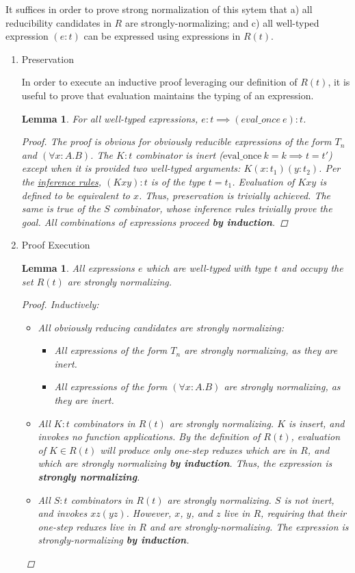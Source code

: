 \documentclass[11pt]{article}
\newtheorem{lemma}[theorem]{Lemma}
\begin{document}
It suffices in order to prove strong normalization of this sytem that a) all reducibility candidates in \(R\) are strongly-normalizing; and c) all well-typed expression \((e : t)\) can be expressed using expressions in \(R(t)\).
\begin{enumerate}
\item Preservation
\label{sec:orgbb7a623}

In order to execute an inductive proof leveraging our definition of \(R(t)\), it is useful to prove that evaluation maintains the typing of an expression.

\begin{lemma}
For all well-typed expressions, $e : t \implies (eval\_once\ e) : t$.
\begin{proof}
The proof is obvious for obviously reducible expressions of the form $T_{n}$ and $(\forall x:A.B)$.
The $K : t$ combinator is inert ($\text{eval\_once}\ k = k \implies t = t'$) except when it is provided two well-typed arguments: $K (x : t_{1}) (y : t_{2})$.
Per the \href{inference:1}{inference rules}, $(K x y) : t$ is of the type $t = t_{1}$.
Evaluation of $K x y$ is defined to be equivalent to $x$. Thus, preservation is trivially achieved.
The same is true of the $S$ combinator, whose inference rules trivially prove the goal. All combinations of expressions proceed \textbf{by induction}.
\end{proof}
\end{lemma}
\item Proof Execution
\label{sec:org8ec307d}

\begin{lemma}
All expressions $e$ which are well-typed with type $t$ and occupy the set $R(t)$ are strongly normalizing.
\begin{proof}
Inductively: \\
\begin{itemize}
\item All obviously reducing candidates are strongly normalizing:
\begin{itemize}
\item All expressions of the form $T_{n}$ are strongly normalizing, as they are inert.
\item All expressions of the form $(\forall x : A.B)$ are strongly normalizing, as they are inert.
\end{itemize}
\item All $K : t$ combinators in $R(t)$ are strongly normalizing. $K$ is insert, and invokes no function applications. By the definition of $R(t)$, evaluation of $K \in R(t)$ will produce only one-step reduxes which are in $R$, and which are strongly normalizing \textbf{by induction}. Thus, the expression is \textbf{strongly normalizing}.
\item All $S : t$ combinators in $R(t)$ are strongly normalizing. $S$ is not inert, and invokes $xz (yz)$. However, $x$, $y$, and $z$ live in $R$, requiring that their one-step reduxes live in $R$ and are strongly-normalizing. The expression is strongly-normalizing \textbf{by induction}.
\end{itemize}
\end{proof}
\end{lemma}


\end{enumerate}
\end{document}

